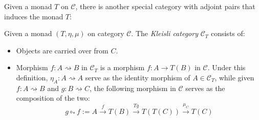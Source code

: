 \documentclass{article}
\begin{document}
Given a monad $T$ on $\mathcal{C}$, there is another special category with adjoint pairs that induces the monad $T$:
\begin{defn}
    Given a monad $(T,\eta,\mu)$ on category $\mathcal{C}$. The \emph{Kleisli category} $\mathcal{C}_T$ consists of:
    \begin{itemize}
        \item Objects are carried over from $C$.
        \item Morphism $f:A\rightsquigarrow B$ in $\mathcal{C}_T$ is a morphism $f:A\rightarrow T(B)$ in $\mathcal{C}$. Under this definition, $\eta_A:A\rightsquigarrow A$ serve as the identity morphism of $A\in\mathcal{C}_T$, while given $f:A\rightsquigarrow B$ and $g:B\rightsquigarrow C$, the following morphism in $\mathcal{C}$ serves as the composition of the two:
        \[g\circ_* f:= A \xrightarrow{f} T(B) \xrightarrow{Tg} T(T(C)) \xrightarrow{\mu_C}T(C)\]
    \end{itemize}
\end{defn}
\end{document}
